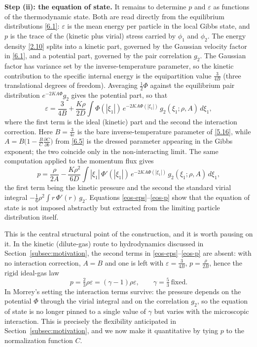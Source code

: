 \documentclass[11pt]{article}
\begin{document}
\medskip
\noindent\textbf{Step (ii): the equation of state.}
It remains to determine $p$ and $\varepsilon$ as functions of the thermodynamic state. Both are read directly from the equilibrium distributions \eqref{6.1}: $\varepsilon$ is the mean energy per particle in the local Gibbs state, and $p$ is the trace of the (kinetic plus virial) stress carried by $\phi_1$ and $\phi_2$. The energy density \eqref{2.10} splits into a kinetic part, governed by the Gaussian velocity factor in \eqref{6.1}, and a potential part, governed by the pair correlation $g_2$. The Gaussian factor has variance set by the inverse-temperature parameter, so the kinetic contribution to the specific internal energy is the equipartition value $\tfrac{3}{4B}$ (three translational degrees of freedom). Averaging $\tfrac12\Phi$ against the equilibrium pair distribution $e^{-2KA\Phi}g_2$ gives the potential part, so that
\begin{equation}\label{eos-eps}\tag{8.4}
\varepsilon
 = \frac{3}{4B}
   + \frac{K\rho}{2D}
     \int \Phi(|\xi_1|)\,
     e^{-2KA\Phi(|\xi_1|)}\, g_2(\xi_1;\rho,A)\,d\xi_1,
\end{equation}
where the first term is the ideal (kinetic) part and the second the interaction correction. Here $B=\tfrac{3}{4\varepsilon}$ is the bare inverse-temperature parameter of \eqref{5.16}, while $A=B\big(1-\tfrac{B}{C}\tfrac{\partial C}{\partial b}\big)$ from \eqref{6.5} is the dressed parameter appearing in the Gibbs exponent; the two coincide only in the non-interacting limit. The same computation applied to the momentum flux gives
\begin{equation}\label{eos-p}\tag{8.5}
p
 = \frac{\rho}{2A}
   - \frac{K\rho^2}{6D}
     \int |\xi_1|\,\Phi'(|\xi_1|)\,
     e^{-2KA\Phi(|\xi_1|)}\, g_2(\xi_1;\rho,A)\,d\xi_1,
\end{equation}
the first term being the kinetic pressure and the second the standard virial integral $-\tfrac16\rho^2\!\int r\,\Phi'(r)\,g_2$. Equations \eqref{eos-eps}--\eqref{eos-p} show that the equation of state is not imposed abstractly but extracted from the limiting particle distribution itself.

This is the central structural point of the construction, and it is worth pausing on it. In the kinetic (dilute-gas) route to hydrodynamics discussed in Section~\ref{subsec:motivation}, the second terms in \eqref{eos-eps}--\eqref{eos-p} are absent: with no interaction correction, $A=B$ and one is left with $\varepsilon=\tfrac{3}{4B}$, $p=\tfrac{\rho}{2B}$, hence the rigid ideal-gas law
\[
p=\tfrac23\rho\varepsilon=(\gamma-1)\rho\varepsilon,\qquad \gamma=\tfrac53\ \text{fixed.}
\]
In Morrey's setting the interaction terms survive: the pressure depends on the potential $\Phi$ through the virial integral and on the correlation $g_2$, so the equation of state is no longer pinned to a single value of $\gamma$ but varies with the microscopic interaction. This is precisely the flexibility anticipated in Section~\ref{subsec:motivation}, and we now make it quantitative by tying $p$ to the normalization function $C$.
\end{document}
